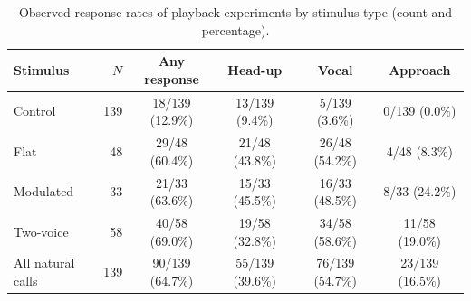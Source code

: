 \begin{table}[!ht]
\centering
\caption{Observed response rates of playback experiments by stimulus type (count and percentage).}
\label{tab:p3rates}
\small
\begin{tabular}{lrcccc}
\toprule
Stimulus & $N$ & Any response & Head-up & Vocal & Approach \\
\midrule
Control & 139 & 18/139 (12.9\%) & 13/139 (9.4\%) & 5/139 (3.6\%) & 0/139 (0.0\%) \\
Flat & 48 & 29/48 (60.4\%) & 21/48 (43.8\%) & 26/48 (54.2\%) & 4/48 (8.3\%) \\
Modulated & 33 & 21/33 (63.6\%) & 15/33 (45.5\%) & 16/33 (48.5\%) & 8/33 (24.2\%) \\
Two-voice & 58 & 40/58 (69.0\%) & 19/58 (32.8\%) & 34/58 (58.6\%) & 11/58 (19.0\%) \\
All natural calls & 139 & 90/139 (64.7\%) & 55/139 (39.6\%) & 76/139 (54.7\%) & 23/139 (16.5\%) \\
\bottomrule
\end{tabular}
\end{table}